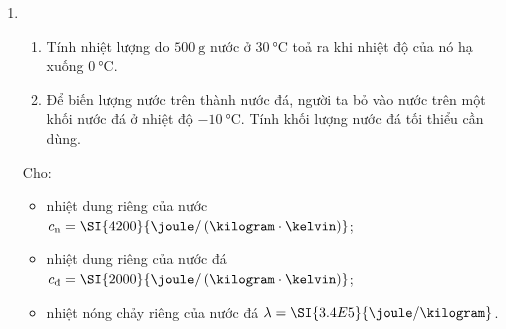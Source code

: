 \begin{enumerate}[label=\bfseries Câu \arabic*:, leftmargin=1.7cm]
\item {}\\
\begin{enumerate}[label=\alph*)]
	\item Tính nhiệt lượng do $\SI{500}{\gram}$ nước ở $\SI{30}{\celsius}$ toả ra khi nhiệt độ của nó hạ xuống $\SI{0}{\celsius}$.
	\item Để biến lượng nước trên thành nước đá, người ta bỏ vào nước trên một khối nước đá ở nhiệt độ $\SI{-10}{\celsius}$. Tính khối lượng nước đá tối thiểu cần dùng.
\end{enumerate}
Cho:
\begin{itemize}
	\item nhiệt dung riêng của nước $c_\text{n}=\SI{4200}{\joule/\left(\kilogram\cdot\kelvin\right)}$;
	\item nhiệt dung riêng của nước đá $c_\text{đ}=\SI{2000}{\joule/\left(\kilogram\cdot\kelvin\right)}$;
	\item nhiệt nóng chảy riêng của nước đá $\lambda=\SI{3.4E5}{\joule/\kilogram}$.
\end{itemize}


\end{enumerate}
